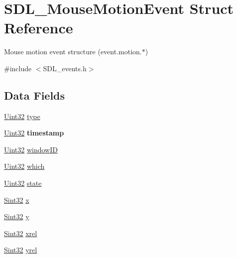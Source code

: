 \hypertarget{struct_s_d_l___mouse_motion_event}{}\section{S\+D\+L\+\_\+\+Mouse\+Motion\+Event Struct Reference}
\label{struct_s_d_l___mouse_motion_event}


Mouse motion event structure (event.\+motion.$\ast$)  




{\ttfamily \#include $<$S\+D\+L\+\_\+events.\+h$>$}

\subsection*{Data Fields}
\begin{DoxyCompactItemize}
\item 
\hyperlink{_s_d_l__stdinc_8h_add440eff171ea5f55cb00c4a9ab8672d}{Uint32} \hyperlink{struct_s_d_l___mouse_motion_event_aa40a9b05c3154032b9f2d7220e9f08dc}{type}
\item 
\hyperlink{_s_d_l__stdinc_8h_add440eff171ea5f55cb00c4a9ab8672d}{Uint32} {\bfseries timestamp}\hypertarget{struct_s_d_l___mouse_motion_event_abf1ed7edeab81db9c05d899836a44a2f}{}\label{struct_s_d_l___mouse_motion_event_abf1ed7edeab81db9c05d899836a44a2f}

\item 
\hyperlink{_s_d_l__stdinc_8h_add440eff171ea5f55cb00c4a9ab8672d}{Uint32} \hyperlink{struct_s_d_l___mouse_motion_event_a78d9995068d6f40cd78bb8db7351b0a1}{window\+ID}
\item 
\hyperlink{_s_d_l__stdinc_8h_add440eff171ea5f55cb00c4a9ab8672d}{Uint32} \hyperlink{struct_s_d_l___mouse_motion_event_abd239700243abe3b42bfee05bbf65fa7}{which}
\item 
\hyperlink{_s_d_l__stdinc_8h_add440eff171ea5f55cb00c4a9ab8672d}{Uint32} \hyperlink{struct_s_d_l___mouse_motion_event_a497fc2f5ff5e968b3d0b643a537a71fb}{state}
\item 
\hyperlink{_s_d_l__stdinc_8h_a7a90b941db9d4582e9ad7abb9940ff7e}{Sint32} \hyperlink{struct_s_d_l___mouse_motion_event_a133a64253d58ecff038d427c70b5b0aa}{x}
\item 
\hyperlink{_s_d_l__stdinc_8h_a7a90b941db9d4582e9ad7abb9940ff7e}{Sint32} \hyperlink{struct_s_d_l___mouse_motion_event_ae6c55103b58b9a5b746ae4f6fbc9c901}{y}
\item 
\hyperlink{_s_d_l__stdinc_8h_a7a90b941db9d4582e9ad7abb9940ff7e}{Sint32} \hyperlink{struct_s_d_l___mouse_motion_event_a55969edcb446cbb76fe0af1c1965c748}{xrel}
\item 
\hyperlink{_s_d_l__stdinc_8h_a7a90b941db9d4582e9ad7abb9940ff7e}{Sint32} \hyperlink{struct_s_d_l___mouse_motion_event_af5546043bbf1513acaf93d7e04e6f948}{yrel}
\end{DoxyCompactItemize}


